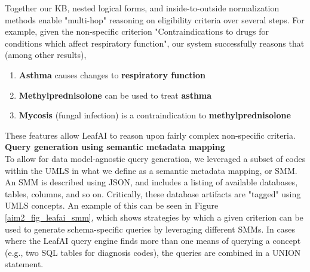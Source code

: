 \documentclass[../main.tex]{subfiles}
\begin{document}
Together our KB, nested logical forms, and inside-to-outside normalization methods enable "multi-hop" reasoning on eligibility criteria over several steps. For example, given the non-specific criterion "Contraindications to drugs for conditions which affect respiratory function", our system successfully reasons that (among other results),

\begin{enumerate}
    \item \textbf{Asthma} causes changes to \textbf{respiratory function}
    \item \textbf{Methylprednisolone} can be used to treat \textbf{asthma}
    \item \textbf{Mycosis} (fungal infection) is a contraindication to \textbf{methylprednisolone}
\end{enumerate}

\noindent These features allow LeafAI to reason upon fairly complex non-specific criteria. \\

\noindent \textbf{Query generation using semantic metadata mapping} \\
To allow for data model-agnostic query generation, we leveraged a subset of codes within the UMLS in what we define as a semantic metadata mapping, or SMM. An SMM is described using JSON, and includes a listing of available databases, tables, columns, and so on. Critically, these database artifacts are "tagged" using UMLS concepts. An example of this can be seen in Figure \ref{aim2_fig_leafai_smm}, which shows strategies by which a given criterion can be used to generate schema-specific queries by leveraging different SMMs. In cases where the LeafAI query engine finds more than one means of querying a concept (e.g., two SQL tables for diagnosis codes), the queries are combined in a UNION statement.
\end{document}

